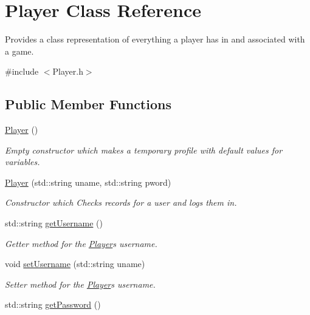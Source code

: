 \hypertarget{class_player}{}\section{Player Class Reference}
\label{class_player}


Provides a class representation of everything a player has in and associated with a game.  




{\ttfamily \#include $<$Player.\+h$>$}

\subsection*{Public Member Functions}
\begin{DoxyCompactItemize}
\item 
\mbox{\hyperlink{class_player_affe0cc3cb714f6deb4e62f0c0d3f1fd8}{Player}} ()
\begin{DoxyCompactList}\small\item\em Empty constructor which makes a temporary profile with default values for variables. \end{DoxyCompactList}\item 
\mbox{\hyperlink{class_player_a61d2a5c3a5f6a6e4a408ba802337af51}{Player}} (std\+::string uname, std\+::string pword)
\begin{DoxyCompactList}\small\item\em Constructor which Checks records for a user and logs them in. \end{DoxyCompactList}\item 
std\+::string \mbox{\hyperlink{class_player_a73c00480e9459d52998262f23f6fc5dc}{get\+Username}} ()
\begin{DoxyCompactList}\small\item\em Getter method for the \mbox{\hyperlink{class_player}{Player}}\textquotesingle{}s username. \end{DoxyCompactList}\item 
void \mbox{\hyperlink{class_player_a8fc488bcda5714ae92466d2936380787}{set\+Username}} (std\+::string uname)
\begin{DoxyCompactList}\small\item\em Setter method for the \mbox{\hyperlink{class_player}{Player}}\textquotesingle{}s username. \end{DoxyCompactList}\item 
std\+::string \mbox{\hyperlink{class_player_aef0e6355f59ecc9a72dfda313c603b5e}{get\+Password}} ()

\end{DoxyCompactItemize}
